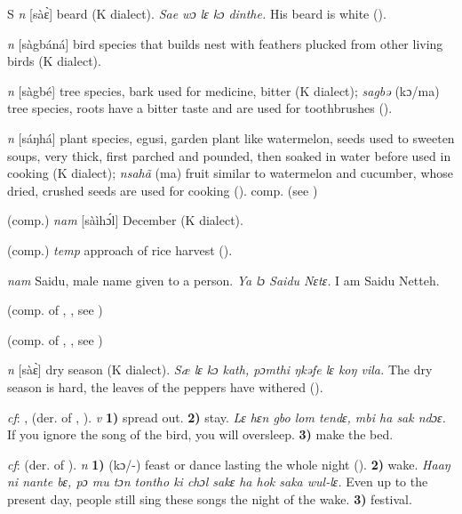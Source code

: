 \begin{letter}{S}
 \textit{n} [sàɛ̀] beard (K dialect). \textit{Sae wɔ lɛ kɔ dinthe.} His beard is white (\citealt{Pichl1967}).

 \textit{n} [sàgbáná] bird species that builds nest with feathers plucked from other living birds (K dialect). 

 \textit{n} [sàgbé] tree species, bark used for medicine, bitter (K dialect); \textit{sagbə} (kɔ/ma) tree species, roots have a bitter taste and are used for toothbrushes (\citealt{Pichl1967}). 



 \textit{n} [sáŋhá] plant species, egusi, garden plant like watermelon, seeds used to sweeten soups, very thick, first parched and pounded, then soaked in water before used in cooking (K dialect); \textit{nsahã} (ma) fruit similar to watermelon and cucumber, whose dried, crushed seeds are used for cooking (\citealt{Pichl1967}). comp.  (see ) 

 (comp.) \textit{nam} [sàìhɔ́l] December (K dialect).

 (comp.) \textit{temp} approach of rice harvest (\citealt{Pichl1967}). 

 \textit{nam} Saidu, male name given to a person. \textit{Ya lɔ Saidu Nɛtɛ.} I am Saidu Netteh.

 (comp. of , , see ) 

 (comp. of , , see ) 

 \textit{n} [sàɛ̀] dry season (K dialect). \textit{Sæ lɛ kɔ kath, pɔmthi ŋkəfe lɛ koŋ vila.} The dry season is hard, the leaves of the peppers have withered (\citealt{Pichl1967}). 

 \textit{cf}: ,  (der. of , ). \textit{v} \textbf{1)} spread out. \textbf{2)} stay. \textit{Lɛ hɛn gbo lom tendɛ, mbi ha sak ndɔɛ.} If you ignore the song of the bird, you will oversleep. \textbf{3)} make the bed.

 \textit{cf}:  (der. of ). \textit{n} \textbf{1)} (kɔ/-) feast or dance lasting the whole night (\citealt{Pichl1967}). \textbf{2)} wake. \textit{Haaŋ ni nante bɛ, pɔ mu tɔn tontho ki chɔl sakɛ ha hok saka wul-lɛ.} Even up to the present day, people still sing these songs the night of the wake. \textbf{3)} festival.


\end{letter}
